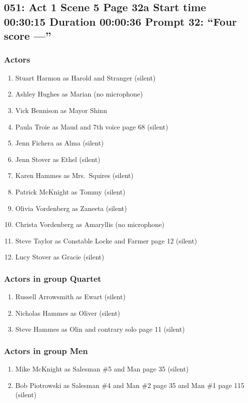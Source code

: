 \subsection{051: Act 1 Scene 5 Page 32a Start time 00:30:15 Duration 00:00:36 Prompt 32: ``Four score ---''}

\subsubsection{Actors}
\begin{enumerate}
\item Stuart Harmon as Harold and Stranger (silent)
\item Ashley Hughes as Marian (no microphone)
\item Vick Bennison as Mayor Shinn
\item Paula Troie as Maud and 7th voice page 68 (silent)
\item Jenn Fichera as Alma (silent)
\item Jenn Stover as Ethel (silent)
\item Karen Hammes as Mrs.~Squires (silent)
\item Patrick McKnight as Tommy (silent)
\item Olivia Vordenberg as Zaneeta (silent)
\item Christa Vordenberg as Amaryllis (no microphone)
\item Steve Taylor as Constable Locke and Farmer page 12 (silent)
\item Lucy Stover as Gracie (silent)
\end{enumerate}
\subsubsection{Actors in group Quartet}
\begin{enumerate}
\item Russell Arrowsmith as Ewart (silent)
\item Nicholas Hammes as Oliver (silent)
\item Steve Hammes as Olin and contrary solo page 11 (silent)
\end{enumerate}
\subsubsection{Actors in group Men}
\begin{enumerate}
\item Mike McKnight as Salesman \#5 and Man page 35 (silent)
\item Bob Piotrowski as Salesman \#4 and Man \#2 page 35 and Man \#1 page 115 (silent)
\end{enumerate}

